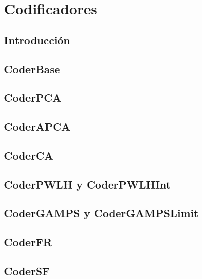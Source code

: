 
\chapter{Codificadores} %

\label{Codificadores} %


\section{Introducción}
\label{secC:introduccion}

\section{CoderBase}
\label{secC:CoderBase}


\section{CoderPCA}
\label{secC:CoderPCA}

\section{CoderAPCA}
\label{secC:CoderPCA}

\section{CoderCA}
\label{secC:CoderCA}

\section{CoderPWLH y CoderPWLHInt}
\label{secC:CoderPWLH}

\section{CoderGAMPS y CoderGAMPSLimit}
\label{secC:CoderGAMPS}

\section{CoderFR}
\label{secC:CoderFR}

\section{CoderSF}
\label{secC:CoderSF}
